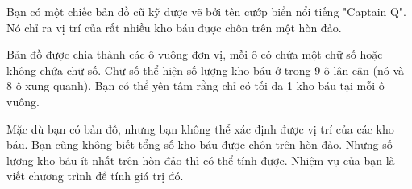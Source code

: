 Bạn có một chiếc bản đồ cũ kỹ được vẽ bởi tên cướp biển nổi tiếng "Captain Q". Nó chỉ ra vị trí của rất nhiều kho báu được chôn trên một hòn đảo.

Bản đồ được chia thành các ô vuông đơn vị, mỗi ô có chứa một chữ số hoặc không chứa chữ số. Chữ số thể hiện số lượng kho báu ở trong 9 ô lân cận (nó và 8 ô xung quanh). Bạn có thể yên tâm rằng chỉ có tối đa 1 kho báu tại mỗi ô vuông.

Mặc dù bạn có bản đồ, nhưng bạn không thể xác định được vị trí của các kho báu. Bạn cũng không biết tổng số kho báu được chôn trên hòn đảo. Nhưng số lượng kho báu ít nhất trên hòn đảo thì có thể tính được. Nhiệm vụ của bạn là viết chương trình để tính giá trị đó.